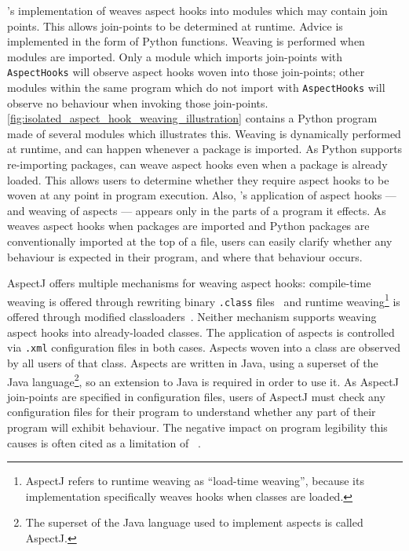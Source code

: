 \pdsfthree{}'s implementation of \aop weaves aspect hooks into modules which may
contain join points. This allows join-points to be determined at runtime. Advice
is implemented in the form of Python functions. Weaving is performed when
modules are imported. Only a module which imports join-points with
\lstinline{AspectHooks} will observe aspect hooks woven into those join-points;
other modules within the same program which do not import with
\lstinline{AspectHooks} will observe no \aspectoriented behaviour when invoking
those join-points. \cref{fig:isolated_aspect_hook_weaving_illustration} contains
a Python program made of several modules which illustrates this. Weaving is
dynamically performed at runtime, and can happen whenever a package is imported.
As Python supports re-importing packages, \pdsfthree can weave aspect hooks even
when a package is already loaded. This allows \pdsfthree users to determine
whether they require aspect hooks to be woven at any point in program execution.
Also, \pdsfthree{}'s application of aspect hooks --- and weaving of aspects ---
appears only in the parts of a program it effects. As \pdsfthree weaves aspect
hooks when packages are imported and Python packages are conventionally imported
at the top of a file, \pdsfthree users can easily clarify whether any
\aspectoriented behaviour is expected in their program, and where that behaviour
occurs.

AspectJ offers multiple mechanisms for weaving aspect hooks: compile-time
weaving is offered through rewriting binary \lstinline{.class}
files~\cite{aspectj-bytecode-weaving-documentation} and runtime
weaving\footnote{AspectJ refers to runtime weaving as ``load-time weaving'',
because its implementation specifically weaves hooks when classes are loaded.}
is offered through modified classloaders~\cite{aspectj_ltw_docs}. Neither
mechanism supports weaving aspect hooks into already-loaded classes. The
application of aspects is controlled via \lstinline{.xml} configuration files in
both cases. Aspects woven into a class are observed by all users of that class.
Aspects are written in Java, using a superset of the Java language\footnote{The
superset of the Java language used to implement aspects is called AspectJ.}, so
an extension to Java is required in order to use it. As AspectJ join-points are
specified in configuration files, users of AspectJ must check any configuration
files for their program to understand whether any part of their program will
exhibit \aspectoriented behaviour. The negative impact on program legibility
this causes is often cited as a limitation of
\aop{}~\cite{Constantinides04aopconsidered,steimann06paradoxical,przybylek2010wrong,przybylek2018empirical}.

